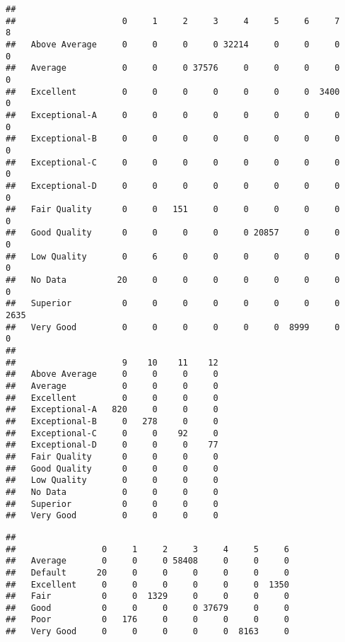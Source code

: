 \documentclass[]{article}
\newenvironment{Shaded}{\begin{snugshade}}{\end{snugshade}}
\newcommand{\KeywordTok}[1]{\textcolor[rgb]{0.13,0.29,0.53}{\textbf{#1}}}
\newcommand{\NormalTok}[1]{#1}
\newcommand{\OperatorTok}[1]{\textcolor[rgb]{0.81,0.36,0.00}{\textbf{#1}}}
\begin{document}
\begin{verbatim}
##                
##                     0     1     2     3     4     5     6     7     8
##   Above Average     0     0     0     0 32214     0     0     0     0
##   Average           0     0     0 37576     0     0     0     0     0
##   Excellent         0     0     0     0     0     0     0  3400     0
##   Exceptional-A     0     0     0     0     0     0     0     0     0
##   Exceptional-B     0     0     0     0     0     0     0     0     0
##   Exceptional-C     0     0     0     0     0     0     0     0     0
##   Exceptional-D     0     0     0     0     0     0     0     0     0
##   Fair Quality      0     0   151     0     0     0     0     0     0
##   Good Quality      0     0     0     0     0 20857     0     0     0
##   Low Quality       0     6     0     0     0     0     0     0     0
##   No Data          20     0     0     0     0     0     0     0     0
##   Superior          0     0     0     0     0     0     0     0  2635
##   Very Good         0     0     0     0     0     0  8999     0     0
##                
##                     9    10    11    12
##   Above Average     0     0     0     0
##   Average           0     0     0     0
##   Excellent         0     0     0     0
##   Exceptional-A   820     0     0     0
##   Exceptional-B     0   278     0     0
##   Exceptional-C     0     0    92     0
##   Exceptional-D     0     0     0    77
##   Fair Quality      0     0     0     0
##   Good Quality      0     0     0     0
##   Low Quality       0     0     0     0
##   No Data           0     0     0     0
##   Superior          0     0     0     0
##   Very Good         0     0     0     0
\end{verbatim}

\begin{Shaded}
\end{Shaded}

\begin{verbatim}
##            
##                 0     1     2     3     4     5     6
##   Average       0     0     0 58408     0     0     0
##   Default      20     0     0     0     0     0     0
##   Excellent     0     0     0     0     0     0  1350
##   Fair          0     0  1329     0     0     0     0
##   Good          0     0     0     0 37679     0     0
##   Poor          0   176     0     0     0     0     0
##   Very Good     0     0     0     0     0  8163     0
\end{verbatim}
\end{document}
